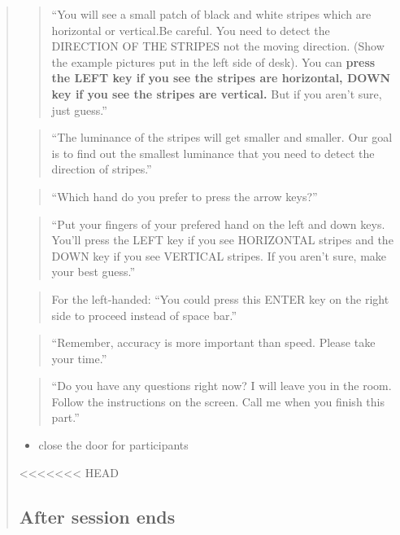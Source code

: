 \documentclass[]{article}
\providecommand{\tightlist}{%
  \setlength{\itemsep}{0pt}\setlength{\parskip}{0pt}}
\begin{document}
\begin{quote}
\begin{quote}
``You will see a small patch of black and white stripes which are
horizontal or vertical.Be careful. You need to detect the DIRECTION OF
THE STRIPES not the moving direction. (Show the example pictures put in
the left side of desk). You can \textbf{press the LEFT key if you see
the stripes are horizontal, DOWN key if you see the stripes are
vertical.} But if you aren't sure, just guess.''
\end{quote}

\begin{quote}
``The luminance of the stripes will get smaller and smaller. Our goal is
to find out the smallest luminance that you need to detect the direction
of stripes.''
\end{quote}

\begin{quote}
``Which hand do you prefer to press the arrow keys?''
\end{quote}

\begin{quote}
``Put your fingers of your prefered hand on the left and down keys.
You'll press the LEFT key if you see HORIZONTAL stripes and the DOWN key
if you see VERTICAL stripes. If you aren't sure, make your best guess.''
\end{quote}

\begin{quote}
For the left-handed: ``You could press this ENTER key on the right side
to proceed instead of space bar.''
\end{quote}

\begin{quote}
``Remember, accuracy is more important than speed. Please take your
time.''
\end{quote}

\begin{quote}
``Do you have any questions right now? I will leave you in the room.
Follow the instructions on the screen. Call me when you finish this
part.''
\end{quote}

\begin{itemize}
\tightlist
\item
  close the door for participants
\end{itemize}

<<<<<<< HEAD
\subsection{After session ends}\label{after-session-ends}


\end{quote}
\end{document}
